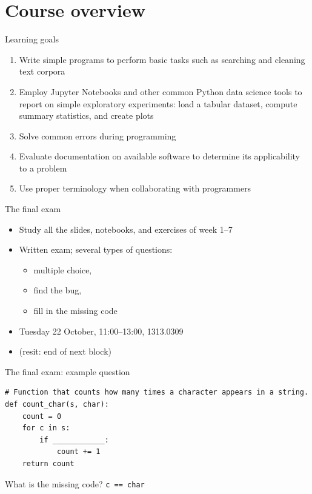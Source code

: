 \documentclass[aspectratio=169,usenames,dvipsnames]{beamer}
\begin{document}
\section{Course overview}
\frame{\tableofcontents[currentsubsection]}

\begin{frame}{Learning goals}
    \begin{enumerate}
        \item Write simple programs to perform basic tasks such as searching and
            cleaning text corpora
        \item Employ Jupyter Notebooks and other common Python data science
            tools to report on simple exploratory experiments: load a tabular
            dataset, compute summary statistics, and create plots
        \item Solve common errors during programming
        \item Evaluate documentation on available software to determine its
            applicability to a problem
        \item Use proper terminology when collaborating with programmers
    \end{enumerate}
\end{frame}

\begin{frame}{The final exam}
    \begin{itemize}
        \item Study all the slides, notebooks, and exercises of week 1--7
        \item Written exam; several types of questions:
            \begin{itemize}
                \item multiple choice, \item find the bug, \item fill in the missing code
            \end{itemize}
        \item Tuesday 22 October, 11:00–13:00, 1313.0309
        \item (resit: end of next block)
    \end{itemize}
\end{frame}

\begin{frame}[fragile]{The final exam: example question}
\begin{lstlisting}
# Function that counts how many times a character appears in a string.
def count_char(s, char):
    count = 0
    for c in s:
        if ____________:
            count += 1
    return count
\end{lstlisting}

What is the missing code?
    \pause \lstinline{c == char}
\end{frame}
\end{document}
